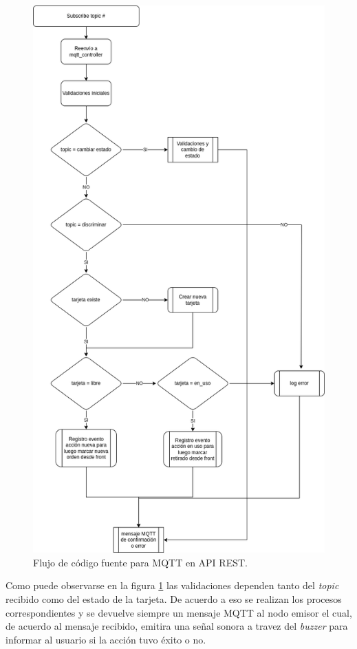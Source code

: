 \begin{figure}[ht]
	\centering
	\includegraphics[scale=.50]{./Figures/mqtt-controller-api.png}
	\caption{Flujo de código fuente para MQTT en API REST.}
	\label{fig:mqttcontrollerapi}
\end{figure}

Como puede observarse en la figura \ref{fig:mqttcontrollerapi} las validaciones dependen tanto del \textit{topic} recibido como del estado de la tarjeta. De acuerdo a eso se realizan los procesos correspondientes y se devuelve siempre un mensaje MQTT al nodo emisor el cual, de acuerdo al mensaje recibido, emitira una señal sonora a travez del \textit{buzzer} para informar al usuario si la acción tuvo éxito o no.


